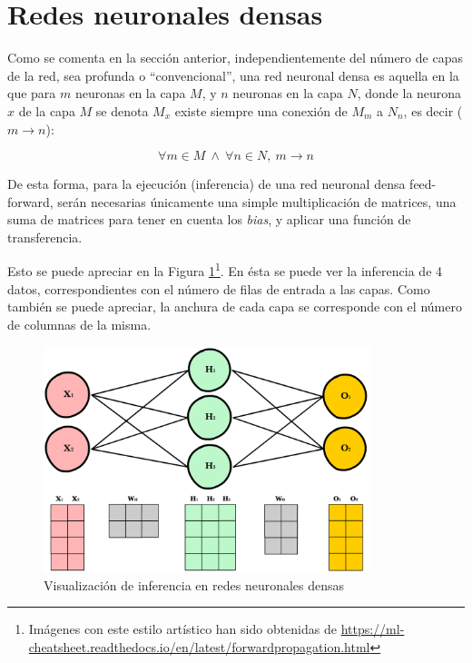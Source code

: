 \section{Redes neuronales densas}
\label{sec:redes_reuronales_densas}
Como se comenta en la sección anterior, independientemente del número de capas de la red, sea profunda o ``convencional'', una red neuronal densa es aquella en la que para $m$ neuronas en la capa $M$, y $n$ neuronas en la capa $N$, donde la neurona $x$ de la capa $M$ se denota $M_{x}$ existe siempre una conexión de $M_{m}$ a $N_{n}$, es decir ($m\longrightarrow n$):

\begin{equation}
\forall m \in M \:\wedge\: \forall n \in N, \: m\longrightarrow n
\label{eq:dense_nn}
\end{equation}

De esta forma, para la ejecución (inferencia) de una red neuronal densa feed-forward, serán necesarias únicamente una simple multiplicación de matrices, una suma de matrices para tener en cuenta los \textit{bias}, y aplicar una función de transferencia.

Esto se puede apreciar en la Figura \ref{fig:nn_matrix_dense}\footnote{Imágenes con este estilo artístico han sido obtenidas de \url{https://ml-cheatsheet.readthedocs.io/en/latest/forwardpropagation.html}}. En ésta se puede ver la inferencia de 4 datos, correspondientes con el número de filas de entrada a las capas. Como también se puede apreciar, la anchura de cada capa se corresponde con el número de columnas de la misma. 

\begin{figure}[h!]
    \centering
    \includegraphics[width=0.85\textwidth]{img/neural_network_matrix_dense.png}
    \caption{Visualización de inferencia en redes neuronales densas}
    \label{fig:nn_matrix_dense}
\end{figure}

